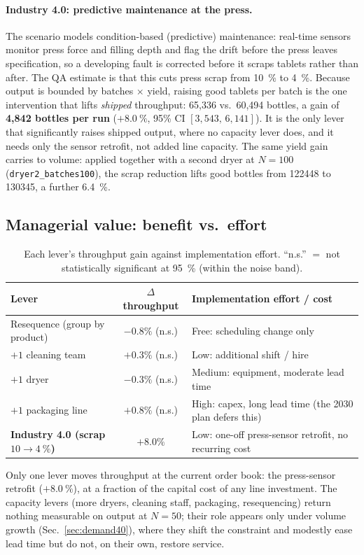 \paragraph{Industry 4.0: predictive maintenance at the press.}
The scenario models condition-based (predictive) maintenance: real-time sensors
monitor press force and filling depth and flag the drift before the press leaves
specification, so a developing fault is corrected before it scraps tablets rather
than after. The QA estimate is that this cuts press scrap from \SI{10}{\percent}
to \SI{4}{\percent}. Because output is bounded by batches $\times$ yield, raising
good tablets per batch is the one intervention that lifts \emph{shipped}
throughput: 65{,}336 vs.\ 60{,}494 bottles, a gain of \textbf{4{,}842 bottles per
run} ($+\SI{8.0}{\percent}$, 95\% CI $[3{,}543,\,6{,}141]$). It is the only lever
that significantly raises shipped output, where no capacity lever does, and it
needs only the sensor retrofit, not added line capacity. The same yield gain
carries to volume: applied together with a second dryer at $N=100$
(\texttt{dryer2\_batches100}), the scrap reduction lifts good bottles from
\num{122448} to \num{130345}, a further \SI{6.4}{\percent}.

\subsection{Managerial value: benefit vs.\ effort}
\label{sec:value}
\begin{table}[H]
\centering
\caption{Each lever's throughput gain against implementation effort. ``n.s.''
$=$ not statistically significant at \SI{95}{\percent} (within the noise band).}
\label{tab:value}
\begin{tabularx}{\textwidth}{X c X}
\toprule
Lever & $\Delta$ throughput & Implementation effort / cost \\
\midrule
Resequence (group by product) & $-0.8\%$ (n.s.) & Free: scheduling change only \\
$+1$ cleaning team            & $+0.3\%$ (n.s.) & Low: additional shift / hire \\
$+1$ dryer                    & $-0.3\%$ (n.s.) & Medium: equipment, moderate lead time \\
$+1$ packaging line           & $+0.8\%$ (n.s.) & High: capex, long lead time (the 2030 plan defers this) \\
\textbf{Industry 4.0 (scrap $10\rightarrow\SI{4}{\percent}$)} & \textbf{$+8.0\%$} & Low: one-off press-sensor retrofit, no recurring cost \\
\bottomrule
\end{tabularx}
\end{table}

Only one lever moves throughput at the current order book: the press-sensor
retrofit ($+\SI{8.0}{\percent}$), at a fraction of the capital cost of any line
investment. The capacity levers (more dryers, cleaning staff, packaging,
resequencing) return nothing measurable on output at $N=50$; their role appears
only under volume growth (Sec.~\ref{sec:demand40}), where they shift the
constraint and modestly ease lead time but do not, on their own, restore service.